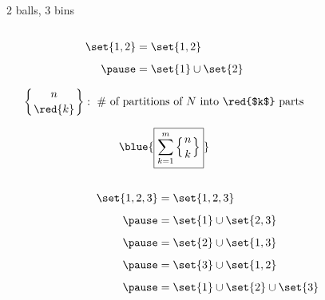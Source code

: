 \begin{frame}{}
  \begin{center}
    2 balls, 3 bins \qquad {}
  \end{center}

  \begin{columns}
    \pause
      \begin{center}
      \end{center}
      \pause
      \begin{center}
        \pause
        \pause
        \begin{align*}
          \set{1, 2} &= \set{1, 2} \\[5pt] \pause
                     &= \set{1} \cup \set{2}
        \end{align*}

        \pause

        \pause
        \[
          \left\{ n \atop \red{k} \right\}: \text{ \# of partitions of $N$ into \red{$k$} parts}
        \]

        \pause
        \vspace{-0.30cm}
        \[
          \blue{\boxed{\sum_{k=1}^{m} \left\{ n \atop k \right\}}}
        \]
      \end{center}
  \end{columns}
\end{frame}

\begin{frame}{}
  \begin{align*}
    \set{1, 2, 3} &= \set{1, 2, 3} \\[5pt] \pause
                  &= \set{1} \cup \set{2, 3}  \\[5pt] \pause
                  &= \set{2} \cup \set{1, 3}  \\[5pt] \pause
                  &= \set{3} \cup \set{1, 2}  \\[5pt] \pause
                  &= \set{1} \cup \set{2} \cup \set{3}
  \end{align*}
\end{frame}


